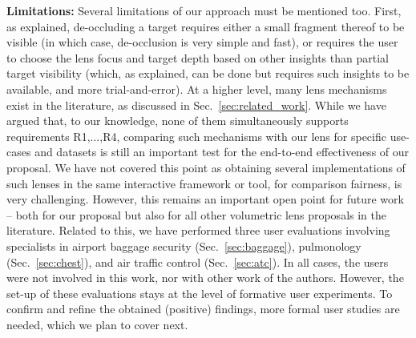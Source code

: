 \vspace{0.15cm}
\noindent\textbf{Limitations:} Several limitations of our approach must be mentioned too. First, as explained, de-occluding a target requires either a small fragment thereof to be visible (in which case, de-occlusion is very simple and fast), or requires the user to choose the lens focus and target depth based on other insights than partial target visibility (which, as explained, can be done but requires such insights to be available, and more trial-and-error). At a higher level, many lens mechanisms exist in the literature, as discussed in Sec.~\ref{sec:related_work}. While we have argued that, to our knowledge, none of them simultaneously supports requirements R1,$\ldots$,R4, comparing such mechanisms with our lens for specific use-cases and datasets is still an important test for the end-to-end effectiveness of our proposal. We have not covered this point as obtaining several implementations of such lenses in the same interactive framework or tool, for comparison fairness, is very challenging. However, this remains an important open point for future work -- both for our proposal but also for all other volumetric lens proposals in the literature. Related to this, we have performed three user evaluations involving specialists in airport baggage security (Sec.~\ref{sec:baggage}), pulmonology (Sec.~\ref{sec:chest}), and air traffic control (Sec.~\ref{sec:atc}). In all cases, the users were not involved in this work, nor with other work of the authors. However, the set-up of these evaluations stays at the level of formative user experiments. To confirm and refine the obtained (positive) findings, more formal user studies are needed, which we plan to cover next.
